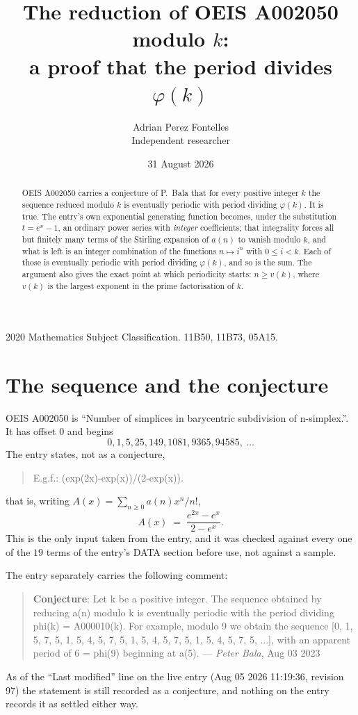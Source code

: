 \documentclass[11pt,a4paper]{article}
\title{The reduction of OEIS A002050 modulo $k$:\\ a proof that the period divides
$\varphi(k)$}
\author{Adrian Perez Fontelles\\ \small Independent researcher}
\date{31 August 2026}
\theoremstyle{plain}
\theoremstyle{definition}
\begin{document}
\maketitle

\begin{abstract}
OEIS A002050 carries a conjecture of P.~Bala that for every positive integer $k$ the
sequence reduced modulo $k$ is eventually periodic with period dividing $\varphi(k)$.
It is true. The entry's own exponential generating function becomes, under the
substitution $t=e^{x}-1$, an ordinary power series with \emph{integer} coefficients;
that integrality forces all but finitely many terms of the Stirling expansion of $a(n)$
to vanish modulo $k$, and what is left is an integer combination of the functions
$n\mapsto i^{n}$ with $0\le i<k$. Each of those is eventually periodic with period
dividing $\varphi(k)$, and so is the sum. The argument also gives the exact point at
which periodicity starts: $n\ge v(k)$, where $v(k)$ is the largest exponent in the
prime factorisation of $k$.
\end{abstract}

\noindent\small 2020 Mathematics Subject Classification. 11B50, 11B73, 05A15.\normalsize

\section{The sequence and the conjecture}

OEIS A002050 is ``Number of simplices in barycentric subdivision of n-simplex.''. It has offset $0$ and begins
\[
0, 1, 5, 25, 149, 1081, 9365, 94585,\ \dots
\]
The entry states, not as a conjecture,
\begin{quote}\small
E.g.f.: (exp(2x)-exp(x))/(2-exp(x)).
\end{quote}
that is, writing $A(x)=\sum_{n\ge 0}a(n)x^{n}/n!$,
\begin{equation}\label{eq:egf}
A(x)\;=\;\frac{e^{2x}-e^{x}}{2-e^{x}}.
\end{equation}
This is the only input taken from the entry, and it was checked against every one of the
$19$ terms of the entry's DATA section before use, not against a sample.

The entry separately carries the following comment:
\begin{quote}\small
\textbf{Conjecture}: Let k be a positive integer. The sequence obtained by reducing a(n) modulo k is eventually periodic with the period dividing phi(k) = A000010(k). For example, modulo 9 we obtain the sequence [0, 1, 5, 7, 5, 1, 5, 4, 5, 7, 5, 1, 5, 4, 5, 7, 5, 1, 5, 4, 5, 7, 5, ...], with an apparent period of 6 = phi(9) beginning at a(5). --- \emph{Peter Bala}, Aug 03 2023
\end{quote}
As of the ``Last modified'' line on the live entry (Aug 05 2026 11:19:36, revision
97) the statement is still recorded as a conjecture, and nothing on the entry
records it as settled either way.
\end{document}
